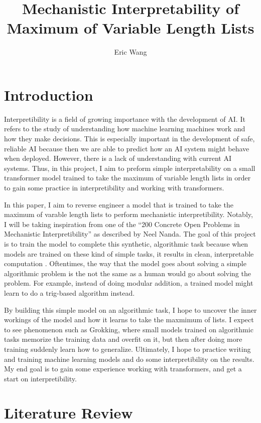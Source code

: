 \documentclass{article}
\title{Mechanistic Interpretability of Maximum of Variable Length Lists}
\author{Eric Wang}
\begin{document}
\maketitle

\section{Introduction}

Interpretibility is a field of growing importance with the development of AI. It refers to the study of understanding how machine learning machines work and how they make decisions. This is especially important in the development of safe, reliable AI because then we are able to predict how an AI system might behave when deployed. However, there is a lack of understanding with current AI systems. Thus, in this project, I aim to preform simple interpretability on a small transformer model trained to take the maximum of variable length lists in order to gain some practice in interpretibility and working with transformers.

In this paper, I aim to reverse engineer a model that is trained to take the maximum of varable length lists to perform mechanistic interpretibility. Notably, I will be taking inspiration from one of the ``200 Concrete Open Problems in Mechanistic Interpretibility'' as described by Neel Nanda. The goal of this project is to train the model to complete this synthetic, algorithmic task because when models are trained on these kind of simple tasks, it results in clean, interpretable computation \cite{1}. Oftentimes, the way that the model goes about solving a simple algorithmic problem is the not the same as a human would go about solving the problem. For example, instead of doing modular addition, a trained model might learn to do a trig-based algorithm instead.

By building this simple model on an algorithmic task, I hope to uncover the inner workings of the model and how it learns to take the maxmimum of lists. I expect to see phenomenon such as Grokking, where small models trained on algorithmic tasks memorize the training data and overfit on it, but then after doing more training suddenly learn how to generalize. Ultimately, I hope to practice writing and training machine learning models and do some interpretibility on the results. My end goal is to gain some experience working with transformers, and get a start on interpretibility. 

\section{Literature Review}
\end{document}
